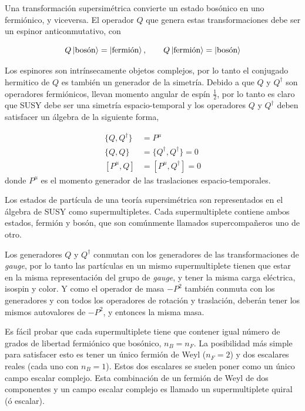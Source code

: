 Una transformación supersimétrica convierte un estado bosónico en uno
fermiónico, y viceversa. El operador $Q$ que genera estas transformaciones debe
ser un espinor anticonmutativo, con

\begin{equation}
  Q \left| \text{bosón} \right> = \left| \text{fermión} \right>, \quad \quad Q
  \left| \text{fermión} \right> = \left| \text{bosón} \right>
\end{equation}

Los espinores son intrínsecamente objetos complejos, por lo tanto el conjugado
hermitico de $Q$ es también un generador de la simetría. Debido a que $Q$ y
$Q^\dagger$ son operadores fermiónicos, llevan momento angular de espín $\frac{1}{2}$, por
lo tanto es claro que SUSY debe ser una simetría espacio-temporal y los
operadores $Q$ y $Q^\dagger$ deben satisfacer un álgebra de la siguiente forma,

\begin{align}
  \{Q, Q^\dagger\} &= P^\mu \\
  \{Q, Q\} &= \{Q^\dagger, Q^\dagger\} = 0 \\
  [P^\mu, Q] &= [P^\mu, Q^\dagger] = 0
\end{align}
%
donde $P^\mu$ es el momento generador de las traslaciones
espacio-temporales.

Los estados de partícula de una teoría supersimétrica son representados en el
álgebra de SUSY como supermultipletes. Cada supermultiplete contiene
ambos estados, fermión y bosón, que son comúnmente llamados supercompa\~neros
uno de otro.

Los generadores $Q$ y $Q^\dagger$ conmutan con los generadores de las
transformaciones de \emph{gauge}, por lo tanto las partículas en un mismo
supermultiplete tienen que estar en la misma representación del grupo de \emph{gauge},
y tener la misma carga eléctrica, isospin y color. Y como el operador de masa
$-P^2$ también conmuta con los generadores y con todos los operadores de
rotación y traslación, deberán tener los mismos autovalores de $-P^2$, y
entonces la misma masa.

Es fácil probar que cada supermultiplete tiene que contener igual número de
grados de libertad fermiónico que bosónico, $n_B = n_F$. La posibilidad más
simple para satisfacer esto es tener un único fermión de Weyl ($n_F=2$) y dos
escalares reales (cada uno con $n_B=1$). Estos dos escalares se suelen poner
como un único campo escalar complejo. Esta combinación de un fermión de Weyl de
dos componentes y un campo escalar complejo es llamado un supermultiplete
quiral (ó escalar).

